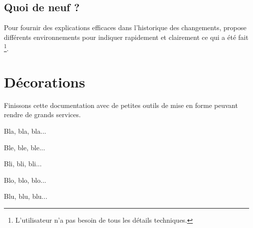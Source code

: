 
\subsection{Quoi de neuf ?}

Pour fournir des explications efficaces dans l'historique des changements,  propose différents environnements pour indiquer rapidement et clairement ce qui a été fait
\footnote{
	L'utilisateur n'a pas besoin de tous les détails techniques.
}.


\begin{bdocexa}
	\leavevmode

\end{bdocexa}




\begin{bdocexa}
	\leavevmode

\end{bdocexa}




\begin{bdocexa}
	\leavevmode

\end{bdocexa}




\begin{bdocexa}
	\leavevmode

\end{bdocexa}


\section{Décorations}

Finissons cette documentation avec de petites outils de mise en forme peuvant rendre de grands services.

\begin{bdoclatex}[sbs]
Bla, bla, bla...

\bdocsep %

Ble, ble, ble...

Bli, bli, bli...

\bdocxspace %

Blo, blo, blo...

Blu, blu, blu...

\end{bdoclatex}

